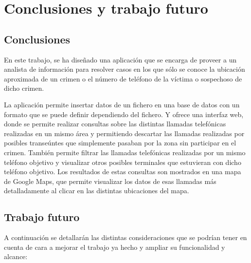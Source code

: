 \chapter{Conclusiones y trabajo futuro\label{CAP:CONCTRAB}}
  \section{Conclusiones\label{SEC:CONCLUSIONES}}
    En este trabajo, se ha diseñado una aplicación que se encarga de proveer a un analista de información para resolver casos en los que sólo se conoce la ubicación aproximada de un crimen o el número de teléfono de la víctima o sospechoso de dicho crimen.
    
    La aplicación permite insertar datos de un fichero en una base de datos con un formato que se puede definir dependiendo del fichero.
    Y ofrece una interfaz web, donde se permite realizar consultas sobre las distintas llamadas telefónicas realizadas en un mismo área y permitiendo descartar las llamadas realizadas por posibles transeúntes que simplemente pasaban por la zona sin participar en el crimen.
    También permite filtrar las llamadas telefónicas realizadas por un mismo teléfono objetivo y visualizar otros posibles terminales que estuvieran con dicho teléfono objetivo.
    Los resultados de estas consultas son mostrados en una mapa de Google Maps, que permite visualizar los datos de esas llamadas más detalladamente al clicar en las distintas ubicaciones del mapa.
    
  \section{Trabajo futuro\label{SEC:TRABAJO}}
    A continuación se detallarán las distintas consideraciones que se podrían tener en cuenta de cara a mejorar el trabajo ya hecho y ampliar su funcionalidad y alcance:
    
